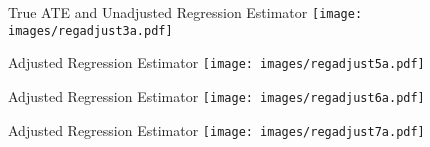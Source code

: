 \documentclass{beamer}
\numberwithin{equation}{section}
\begin{document}
\begin{frame}{True ATE and Unadjusted Regression Estimator}
\centering
    \texttt{[image: images/regadjust3a.pdf]}
\end{frame}


\begin{frame}{Adjusted Regression Estimator}
\centering
    \texttt{[image: images/regadjust5a.pdf]}
\end{frame}

\begin{frame}{Adjusted Regression Estimator}
\centering
    \texttt{[image: images/regadjust6a.pdf]}
\end{frame}


\begin{frame}{Adjusted Regression Estimator}
\centering
    \texttt{[image: images/regadjust7a.pdf]}
\end{frame}


%
%
%
%
%
%
%
%
%
%
%
%
%
%
\end{document}
